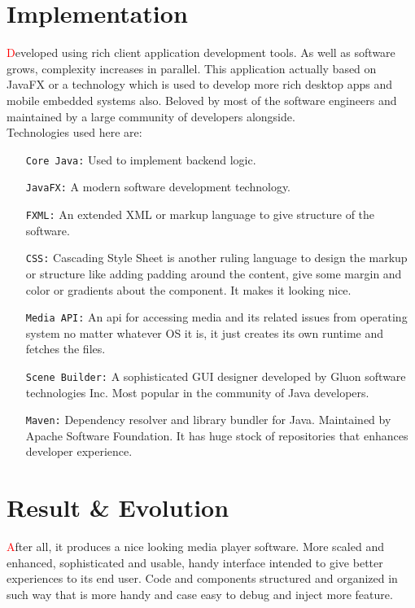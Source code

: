 \documentclass{report}
\begin{document}
\section{Implementation}
\begin{justify}
  {\large
  \hspace*{0.5cm} \textcolor{red}{\large D}eveloped using rich client application development tools.
  As well as software grows, complexity increases in parallel.
  This application actually based on JavaFX or a technology which is used to develop more rich desktop apps and mobile embedded systems also.
  Beloved by most of the software engineers and maintained by a large community of developers alongside.\\
  Technologies used here are:
  }
  \begin{enumerate}
    \item[\texttt{Core Java:} ] Used to implement backend logic.
    \item[\texttt{JavaFX:} ] A modern software development technology.
    \item[\texttt{FXML:} ] An extended XML or markup language to give structure of the software.
    \item[\texttt{CSS:} ] Cascading Style Sheet is another ruling language to design the markup or structure like adding padding around the content, give some margin and color or gradients about the component. It makes it looking nice.
    \item[\texttt{Media API:} ] An api for accessing media and its related issues from operating system no matter whatever OS it is, it just creates its own runtime and fetches the files.
    \item[\texttt{Scene Builder:} ] A sophisticated GUI designer developed by Gluon software technologies Inc. Most popular in the community of Java developers.
    \item[\texttt{Maven:} ] Dependency resolver and library bundler for Java. Maintained by Apache Software Foundation. It has huge stock of repositories that enhances developer experience.
  \end{enumerate}
\end{justify}

\section{Result \& Evolution}
\begin{justify}
  {\large
  \hspace*{0.5cm} \textcolor{red}{\large A}fter all, it produces a nice looking media player software.
  More scaled and enhanced, sophisticated and usable, handy interface intended to give better experiences to its end user.
  Code and components structured and organized in such way that is more handy and case easy to debug and inject more feature.
  }
\end{justify}
\end{document}
